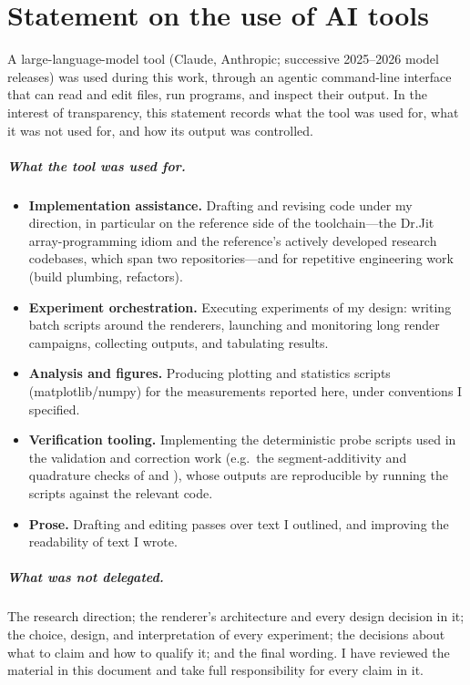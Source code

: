\chapter*{Statement on the use of AI tools}

A large-language-model tool (Claude, Anthropic; successive 2025--2026 model releases) was used
during this work, through an agentic command-line interface that can read and edit files, run
programs, and inspect their output. In the interest of transparency, this statement records what the tool was used for,
what it was not used for, and how its output was controlled.

\paragraph{What the tool was used for.}
\begin{itemize}
  \item \textbf{Implementation assistance.} Drafting and revising code under my direction,
  in particular on the reference side of the toolchain---the Dr.Jit array-programming idiom
  and the reference's actively developed research codebases, which span two
  repositories---and for repetitive engineering work (build plumbing, refactors).
  \item \textbf{Experiment orchestration.} Executing experiments of my design: writing
  batch scripts around the renderers, launching and monitoring long render campaigns,
  collecting outputs, and tabulating results.
  \item \textbf{Analysis and figures.} Producing plotting and statistics scripts
  (matplotlib/numpy) for the measurements reported here, under conventions I specified.
  \item \textbf{Verification tooling.} Implementing the deterministic probe scripts used in
  the validation and correction work (e.g.\ the segment-additivity and quadrature checks of
   and ), whose outputs are reproducible by
  running the scripts against the relevant code.
  \item \textbf{Prose.} Drafting and editing passes over text I outlined, and improving the
  readability of text I wrote.
\end{itemize}

\paragraph{What was not delegated.} The research direction; the renderer's architecture and
every design decision in it; the choice, design, and interpretation of every experiment; the
decisions about what to claim and how to qualify it; and the final wording. I have reviewed
the material in this document and take full responsibility for every claim in it.

